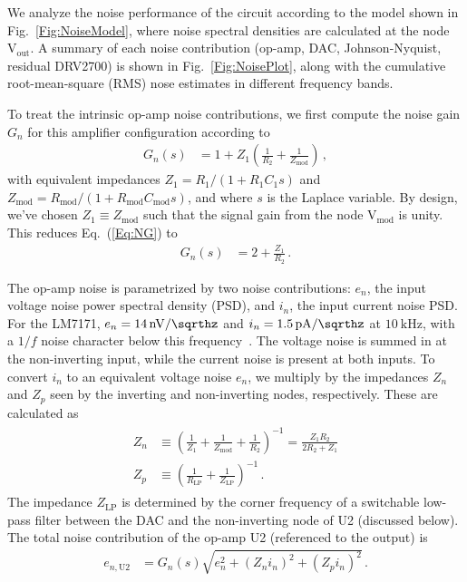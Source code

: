 \documentclass[aip,rsi,reprint]{revtex4-1} %
\begin{document}
We analyze the noise performance of the circuit according to the model shown in Fig.~\ref{Fig:NoiseModel}, where noise spectral densities are calculated at the node $\text{V}_\text{out}$.
A summary of each noise contribution (op-amp, DAC, Johnson-Nyquist, residual DRV2700) is shown in Fig.~\ref{Fig:NoisePlot}, along with the cumulative root-mean-square (RMS) nose estimates in different frequency bands.

To treat the intrinsic op-amp noise contributions, we first compute the noise gain $G_n$ for this amplifier configuration according to
\begin{align}
\label{Eq:NG}
G_n(s) &= 1 + Z_1\left(\frac{1}{R_2} + \frac{1}{Z_\text{mod}}\right)\,,
\end{align}
with equivalent impedances $Z_1 = R_1/(1+R_1 C_1 s)$ and $Z_{\text{mod}} = R_{\text{mod}}/(1+R_{\text{mod}} C_{\text{mod}} s)$, and where $s$ is the Laplace variable.
By design, we've chosen $Z_1 \equiv Z_{\text{mod}}$ such that the signal gain from the node $\text{V}_{\text{mod}}$ is unity.
This reduces Eq.~(\ref{Eq:NG}) to
\begin{align}
\label{Eq:RedNG}
G_n(s) &= 2 + \frac{Z_1}{R_2}\,.
\end{align}

The op-amp noise is parametrized by two noise contributions: $e_n$, the input voltage noise power spectral density (PSD), and $i_n$, the input current noise PSD.
For the LM7171, $e_n = \SI[per-mode=symbol]{14}{\nano\volt\per\sqrthz}$ and $i_n = \SI[per-mode=symbol]{1.5}{\pico\ampere\per\sqrthz}$ at $\SI{10}{\kilo\hertz}$, with a $1/f$ noise character below this frequency~\cite{LM7171Datasheet}.
The voltage noise is summed in at the non-inverting input, while the current noise is present at both inputs.
To convert $i_n$ to an equivalent voltage noise $e_n$, we multiply by the impedances $Z_n$ and $Z_p$ seen by the inverting and non-inverting nodes, respectively.
These are calculated as
\begin{align}
\begin{split}
\label{Eq:ZnZp}
Z_n &\equiv \left(\frac{1}{Z_1} + \frac{1}{Z_\text{mod}} +  \frac{1}{R_2}\right)^{-1}   = \frac{Z_1 R_2}{2R_2 + Z_1} \\
Z_p &\equiv \left(\frac{1}{R_\text{LP}} + \frac{1}{Z_\text{LP}}\right)^{-1}\,.
\end{split}
\end{align}
The impedance $Z_\text{LP}$ is determined by the corner frequency of a switchable low-pass filter between the DAC and the non-inverting node of U2 (discussed below).
The total noise contribution of the op-amp U2 (referenced to the output) is
\begin{align}
\label{Eq:OpAmpNoise}
e_{n,\text{U2}} &= G_n(s)\sqrt{e_n^2 + (Z_n i_n)^2 + (Z_p i_n)^2}\,.
\end{align}
\end{document}
